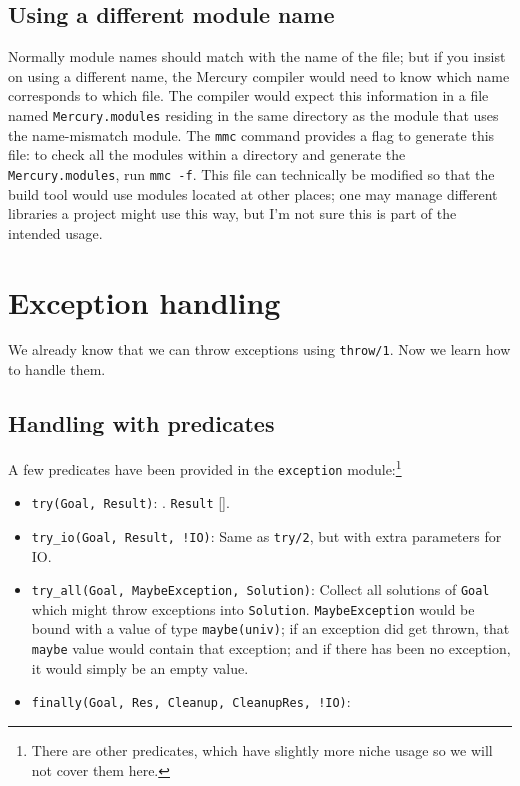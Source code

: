 \subsection{Using a different module name}

Normally module names should match with the name of the file; but if you insist on using a different name, the Mercury compiler would need to know which name corresponds to which file. The compiler would expect this information in a file named \texttt{Mercury.modules} residing in the same directory as the module that uses the name-mismatch module. The \texttt{mmc} command provides a flag to generate this file: to check all the modules within a directory and generate the \texttt{Mercury.modules}, run \texttt{mmc -f}. This file can technically be modified so that the build tool would use modules located at other places; one may manage different libraries a project might use this way, but I'm not sure this is part of the intended usage.

\section{Exception handling}

We already know that we can throw exceptions using \texttt{throw/1}. Now we learn how to handle them.

\subsection{Handling with predicates}

A few predicates have been provided in the \texttt{exception} module:\footnote{There are other predicates, which have slightly more niche usage so we will not cover them here.}

\begin{itemize}
\item \texttt{try(Goal, Result)}: . \texttt{Result} [].
\item \texttt{try_io(Goal, Result, !IO)}: Same as \texttt{try/2}, but with extra parameters for IO.
\item \texttt{try_all(Goal, MaybeException, Solution)}: Collect all solutions of \texttt{Goal} which might throw exceptions into \texttt{Solution}. \texttt{MaybeException} would be bound with a value of type \texttt{maybe(univ)}; if an exception did get thrown, that \texttt{maybe} value would contain that exception; and if there has been no exception, it would simply be an empty value.
  \item \texttt{finally(Goal, Res, Cleanup, CleanupRes, !IO)}:
\end{itemize}

